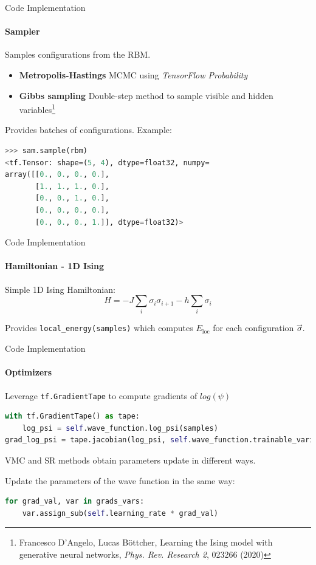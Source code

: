 \documentclass{beamer}
\begin{document}
\begin{frame}[fragile]{Code Implementation}
\framesubtitle{Sampler}

Samples configurations from the RBM.

\begin{itemize}
    \item \textbf{Metropolis-Hastings} MCMC using \textit{TensorFlow Probability}
    \item \textbf{Gibbs sampling} Double-step method to sample visible and hidden variables\footnote{Francesco D'Angelo, Lucas Böttcher, Learning the Ising model with generative neural networks, \textit{Phys. Rev. Research 2}, 023266 (2020)}
\end{itemize}

Provides batches of configurations. Example:
\begin{center}
\begin{lstlisting}[language=Python, style=kaolstplain]
>>> sam.sample(rbm)
<tf.Tensor: shape=(5, 4), dtype=float32, numpy=
array([[0., 0., 0., 0.],
       [1., 1., 1., 0.],
       [0., 0., 1., 0.],
       [0., 0., 0., 0.],
       [0., 0., 0., 1.]], dtype=float32)>
\end{lstlisting}	
\end{center}

\end{frame}

\begin{frame}[fragile]{Code Implementation}
\framesubtitle{Hamiltonian - 1D Ising}

Simple 1D Ising Hamiltonian:
$$ H = -J \sum_{i} \sigma_{i} \sigma_{i+1} - h \sum_{i} \sigma_{i} $$

Provides \lstinline[style=kaolstplain]|local_energy(samples)| which computes $E_{\text{loc}}$ for each configuration $\vec{\sigma}$.

\end{frame}

\begin{frame}[fragile]{Code Implementation}
\framesubtitle{Optimizers}
Leverage \lstinline[style=kaolstplain]|tf.GradientTape| to compute gradients of $log\left(\psi\right)$
\begin{lstlisting}[language=Python, style=kaolstplain]
with tf.GradientTape() as tape:
	log_psi = self.wave_function.log_psi(samples)
grad_log_psi = tape.jacobian(log_psi, self.wave_function.trainable_variables)
\end{lstlisting}
\baselineskip

VMC and SR methods obtain parameters update in different ways.
\baselineskip

Update the parameters of the wave function in the same way:
\begin{lstlisting}[language=Python, style=kaolstplain]
for grad_val, var in grads_vars:
	var.assign_sub(self.learning_rate * grad_val)
\end{lstlisting}
\end{frame}
\end{document}
